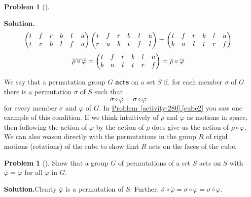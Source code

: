 \documentclass[10pt,]{book}
\newcommand{\terminology}[1]{\textbf{#1}}
\theoremstyle{plain}
\theoremstyle{definition}
\newtheorem{activity}[project]{Problem}
\theoremstyle{definition}
\numberwithin{equation}{chapter}
\newcommand{\amp}{&}
\begin{document}
\begin{activity}[]
\begin{enumerate}[font=\bfseries,label=(\alph*),ref=\alph*]
\par\medskip\noindent%
\textbf{Solution.}\quad %
\begin{equation*}
\begin{pmatrix}t\amp f\amp r\amp b\amp l\amp u\cr t\amp r\amp b\amp l\amp f\amp u
\end{pmatrix} \begin{pmatrix}t\amp f\amp r\amp b\amp l\amp u\cr r\amp u\amp b\amp t\amp f\amp l
\end{pmatrix}  =
\begin{pmatrix}t\amp f\amp r\amp b\amp l\amp u\cr b\amp u\amp l\amp t\amp r\amp f
\end{pmatrix}
\end{equation*}
%
\begin{equation*}
\overline{\rho\circ\varphi} =\begin{pmatrix}t\amp f\amp r\amp b\amp l\amp u\cr
b\amp u\amp l\amp t\amp r\amp f
\end{pmatrix} =\overline{\rho}\circ\overline{\varphi}
\end{equation*}
%
\end{enumerate}
\end{activity}
We say that a permutation group \(G\) \terminology{acts} on a set \(S\) if, for each member \(\sigma\) of \(G\) there is a permutation \(\overline{\sigma}\) of \(S\) such that%
\begin{equation*}
\overline{\sigma\circ\varphi} = \overline{\sigma}\circ\overline{\varphi}
\end{equation*}
for every member \(\sigma\) and \(\varphi\) of \(G\). In \hyperref[cube2]{Problem~\ref{activity-280}.\ref{cube2}} you saw one example of this condition. If we think intuitively of \(\rho\) and \(\varphi\) as motions in space, then following the action of \(\varphi\) by the action of \(\rho\) does give us the action of \(\rho\circ \varphi\). We can also reason directly with the permutations in the group \(R\) of rigid motions (rotations) of the cube to show that \(R\) acts on the faces of the cube.%
\begin{activity}[]\label{activity-281}
Show that a group \(G\) of permutations of a set \(S\) acts on \(S\) with \(\overline{\varphi} = \varphi\) for all \(\varphi\) in \(G\).%
\par\medskip\noindent%
\textbf{Solution.}\quad Clearly \(\overline{\varphi}\) is a permutation of \(S\). Further, \(\overline{\sigma}\circ\overline{\varphi} = \sigma\circ\varphi = \overline{\sigma\circ\varphi}\).%
\end{activity}
\end{document}
